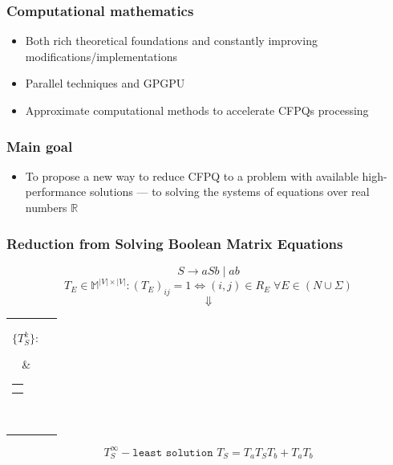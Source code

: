 \documentclass[xcolor=table]{beamer}
\begin{document}
\begin{frame}[fragile]
  \transwipe[direction=90]
  \frametitle{Computational mathematics}
\begin{itemize}
  \item Both rich theoretical foundations and constantly improving modifications/implementations
  \item Parallel techniques and GPGPU
  \item Approximate computational methods to accelerate CFPQs processing
\end{itemize}
\end{frame}

\begin{frame}[fragile]
  \transwipe[direction=90]
  \frametitle{Main goal}
\begin{itemize}
  \item To propose a new way to reduce CFPQ to a problem with available high-performance solutions --- to solving the systems of equations over real numbers $\mathbb{R}$
\end{itemize}



\end{frame}


\begin{frame}[fragile]
  \transwipe[direction=90]
  \frametitle{Reduction from Solving Boolean Matrix Equations}
  
  $$S \rightarrow aSb \mid ab$$
  $$T_E \in \mathbb{M}^{|V| \times |V|}: (T_{E})_{ij} = 1 \iff (i,j) \in R_E \; \forall E \in (N \cup \Sigma)$$
  \pause
  $$\Downarrow$$
    \centering
    \begin{tabular}{cl}
    \parbox{0.07\linewidth}{
    $$\{ T_S^k \}:$$
    }
    & \begin{tabular}{l}
    $T_S^0 = \mathbf{0}$ \\
    $T_S^{k+1} = T_a T_S^k T_b + T_a T_b$
    \end{tabular} \\
    \end{tabular}

  $$T_S^{\infty} - \texttt{least solution } T_S = T_aT_ST_b + T_aT_b$$

\end{frame}
\end{document}
